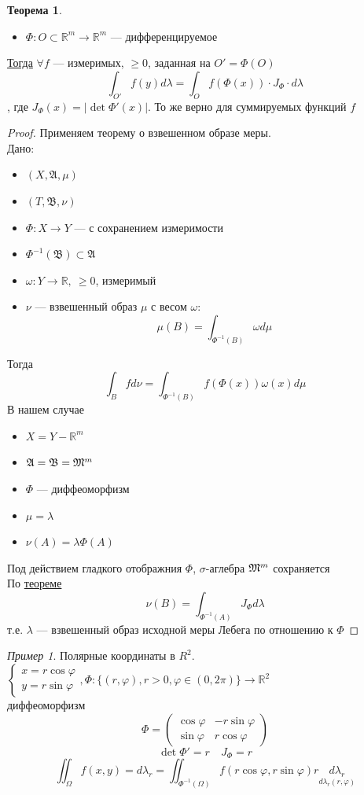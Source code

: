 \documentclass[oneside]{book}
\newcommand{\R}{\mathbb{R}}
\newcommand{\A}{\mathfrak{A}}
\newcommand{\B}{\mathfrak{B}}
\theoremstyle{plain}
\theoremstyle{remark}
\newtheorem*{examp}{Пример}
\theoremstyle{definition}
\newtheorem{theorem}{Теорема}[section]
\begin{document}
\begin{theorem}
\-
\begin{itemize}
\item \(\Phi: O \subset \R^m \to \R^m\) --- дифференцируемое
\end{itemize}
\uline{Тогда} \(\forall f\) --- измеримых, \(\ge 0\), заданная на \(O' = \Phi(O)\)
\[ \int_{O'}f(y) d\lambda = \int_O f(\Phi(x)) \cdot J_\Phi \cdot d\lambda \]
, где \(J_\Phi(x) = |\det \Phi'(x)|\). То же верно для суммируемых функций \(f\)
\end{theorem}
\begin{proof}
Применяем теорему о взвешенном образе меры. \\
Дано:
\begin{itemize}
\item \((X, \A, \mu)\)
\item \((T, \B, \nu)\)
\item \(\Phi: X \to Y\) --- с сохранением измеримости
\item \(\Phi^{-1}(\B) \subset \A\)
\item \(\omega: Y \to \R,\ \ge 0\), измеримый
\item \(\nu\) --- взвешенный образ \(\mu\) с весом \(\omega\): \[\mu(B) = \int_{\Phi^{-1}(B)} \omega d\mu\]
\end{itemize}
Тогда \[ \int_B f d\nu = \int_{\Phi^{-1}(B)}f(\Phi(x)) \omega(x) d\mu \]
В нашем случае
\begin{itemize}
\item \(X = Y - \R^m\)
\item \(\A = \B = \M^m\)
\item \(\Phi\) --- диффеоморфизм
\item \(\mu = \lambda\)
\item \(\nu(A) = \lambda \Phi(A)\)
\end{itemize}
Под действием гладкого отображния \(\Phi\), \(\sigma\)-аглебра \(\mathfrak{M}^m\) сохраняется \\
По \hyperref[org5b1c0b5]{теореме} \[\nu(B) = \int_{\Phi^{-1}(A)} J_\Phi d\lambda\]
т.е. \(\lambda\) --- взвешенный образ исходной меры Лебега по отношению к \(\Phi\)
\end{proof}
\begin{examp}
Полярные координаты в \(R^2\). \\
\(\left\{\begin{array}{l} x = r\cos\varphi \\ y = r\sin\varphi \end{array}\right., \Phi: \{(r, \varphi), r> 0, \varphi \in (0, 2\pi)\} \to \R^2\) \\
диффеоморфизм \[ \Phi = \begin{pmatrix} \cos \varphi & -r \sin\varphi \\ \sin \varphi & r \cos\varphi\end{pmatrix} \]
\[ \det \Phi' = r\quad J_\Phi = r \]
\[ \iint_\Omega f(x, y) = d\lambda_r = \iint_{\Phi^{-1}(\Omega)} f(r \cos\varphi, r\sin\varphi) r \underset{d \lambda_r(r, \varphi)}{d\lambda_r} \]
\end{examp}
\end{document}
